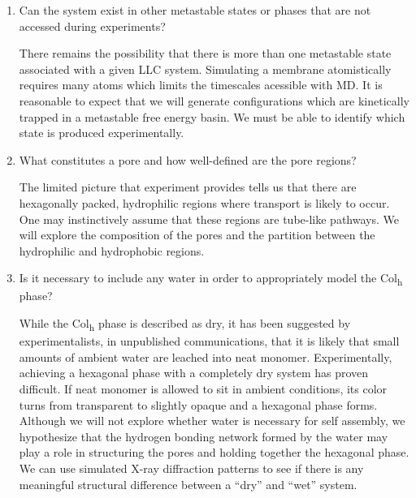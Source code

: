\documentclass{article}
\begin{document}
\begin{enumerate}
  \item Can the system exist in other metastable states or phases that are not
  accessed during experiments? \label{point:metastable}
  
  There remains the possibility that there is more than one metastable state
  associated with a given LLC system. Simulating a membrane atomistically
  requires many atoms which limits the timescales acessible with MD. It is
  reasonable to expect that we will generate configurations which are kinetically
  trapped in a metastable free energy basin. We must be able to identify which
  state is produced experimentally.

  \item What constitutes a pore and how well-defined are the pore regions? \label{point:poredefinition}

  The limited picture that experiment provides tells us that there are
  hexagonally packed, hydrophilic regions where transport is likely to occur.
  One may instinctively assume that these regions are tube-like pathways. We will
  explore the composition of the pores and the partition between the
  hydrophilic and hydrophobic regions. 

  \item Is it necessary to include any water in order to appropriately model
  the Col\textsubscript{h} phase? \label{point:water}

  While the Col\textsubscript{h} phase is described as dry, it has been
  suggested by experimentalists, in unpublished communications, that it is likely
  that small amounts of ambient water are leached into neat monomer.
  Experimentally, achieving a hexagonal phase with a completely dry system has
  proven difficult. If neat monomer is allowed to sit in ambient conditions, its
  color turns from transparent to slightly opaque and a hexagonal phase forms.
  Although we will not explore whether water is necessary for self assembly, we
  hypothesize that the hydrogen bonding network formed by the water may play a
  role in structuring the pores and holding together the hexagonal phase. We can
  use simulated X-ray diffraction patterns to see if there is any meaningful
  structural difference between a ``dry'' and ``wet'' system.

  \end{enumerate}
  
 
\end{document}
